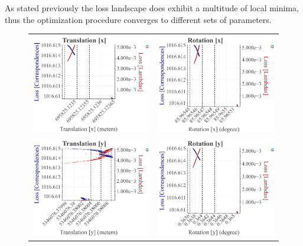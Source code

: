 As stated previously the loss landscape does exhibit a multitude of local minima, thus the optimization procedure converges to different sets of parameters. 

\begin{figure}[t]
  \centering
  \begin{tabular}{cc}
    \includegraphics[width=0.45 \linewidth]{diagrams/calibration/s40_n_far_small/parameters_all.csv/Translation[x]_vs_Loss[Correspondences]_vs_Loss[Lambdas]_cluster_All.png} &
    \includegraphics[width=0.45 \linewidth]{diagrams/calibration/s40_n_far_small/parameters_all.csv/Rotation[x]_vs_Loss[Correspondences]_vs_Loss[Lambdas]_cluster_All.png} \\
    
    \includegraphics[width=0.45 \linewidth]{diagrams/calibration/s40_n_far_small/parameters_all.csv/Translation[y]_vs_Loss[Correspondences]_vs_Loss[Lambdas]_cluster_All.png} &
    \includegraphics[width=0.45 \linewidth]{diagrams/calibration/s40_n_far_small/parameters_all.csv/Rotation[y]_vs_Loss[Correspondences]_vs_Loss[Lambdas]_cluster_All.png} \\
    

\end{tabular}
\end{figure}
